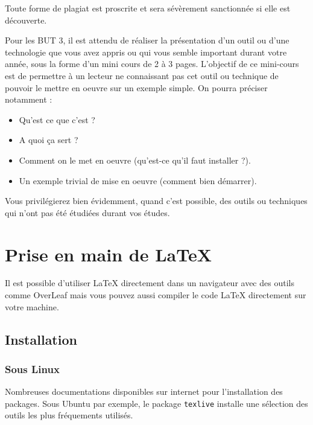 \documentclass[12pt,oneside,noprintercorrection]{iut}
\begin{document}
\begin{aide}{}{}
Toute forme de plagiat est proscrite et sera sévèrement sanctionnée si elle est découverte.
\end{aide}

\begin{aide}{}{}
  Pour les BUT 3, il est attendu de réaliser la présentation d'un outil ou d'une technologie que vous avez appris ou qui vous semble important durant votre année, sous la forme d'un mini cours de 2 à 3 pages.
  L'objectif de ce mini-cours est de permettre à un lecteur ne connaissant pas cet outil ou technique de pouvoir le mettre en oeuvre sur un exemple simple. On pourra préciser notamment :
  \begin{itemize}
  \item Qu'est ce que c'est ?
  \item A quoi ça sert ?
  \item Comment on le met en oeuvre (qu'est-ce qu'il faut installer ?).
  \item Un exemple trivial de mise en oeuvre (comment bien démarrer).
  \end{itemize}
  Vous privilégierez bien évidemment, quand c'est possible, des outils ou techniques qui n'ont pas été étudiées durant vos études.
\end{aide}

\NoChapterHead


\chapter{Prise en main de \LaTeX}

Il est possible d'utiliser {\LaTeX} directement dans un navigateur avec des outils comme OverLeaf mais vous pouvez aussi compiler le code {\LaTeX} directement sur votre machine.

\section{Installation}

\subsection{Sous Linux}
Nombreuses documentations disponibles sur internet pour
l'installation des packages. Sous {\sc Ubuntu} par exemple, 
le package {\tt texlive} installe une sélection des outils les 
plus fréquements utilisés.
\end{document}
